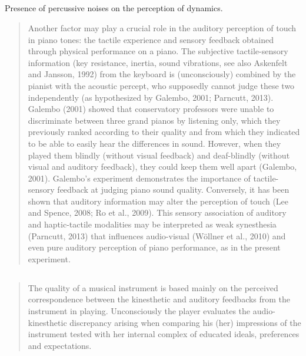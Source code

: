 \subsection{\cite{goebl_perception_2014}}

Presence of percussive noises on the perception of dynamics.

\begin{quotation}
    Another factor may play a crucial role in the auditory perception of touch in piano tones: the tactile experience and sensory feedback obtained through physical performance on a piano. The subjective tactile-sensory information (key resistance, inertia, sound vibrations, see also Askenfelt and Jansson, 1992) from the keyboard is (unconsciously) combined by the pianist with the acoustic percept, who supposedly cannot judge these two independently (as hypothesized by Galembo, 2001; Parncutt, 2013). Galembo (2001) showed that conservatory professors were unable to discriminate between three grand pianos by listening only, which they previously ranked according to their quality and from which they indicated to be able to easily hear the differences in sound. However, when they played them blindly (without visual feedback) and deaf-blindly (without visual and auditory feedback), they could keep them well apart (Galembo, 2001). Galembo's experiment demonstrates the importance of tactile-sensory feedback at judging piano sound quality. Conversely, it has been shown that auditory information may alter the perception of touch (Lee and Spence, 2008; Ro et al., 2009). This sensory association of auditory and haptic-tactile modalities may be interpreted as weak synesthesia (Parncutt, 2013) that influences audio-visual (Wöllner et al., 2010) and even pure auditory perception of piano performance, as in the present experiment.
\end{quotation}


\subsection{\cite{galembo_quality_2003}}

\begin{quotation}
    The quality of a musical instrument is based
mainly on the perceived correspondence between
the kinesthetic and auditory feedbacks from the
instrument in playing. Unconsciously the player
evaluates the audio-kinesthetic discrepancy
arising when comparing his (her) impressions of
the instrument tested with her internal complex of
educated ideals, preferences and expectations.
\end{quotation}


